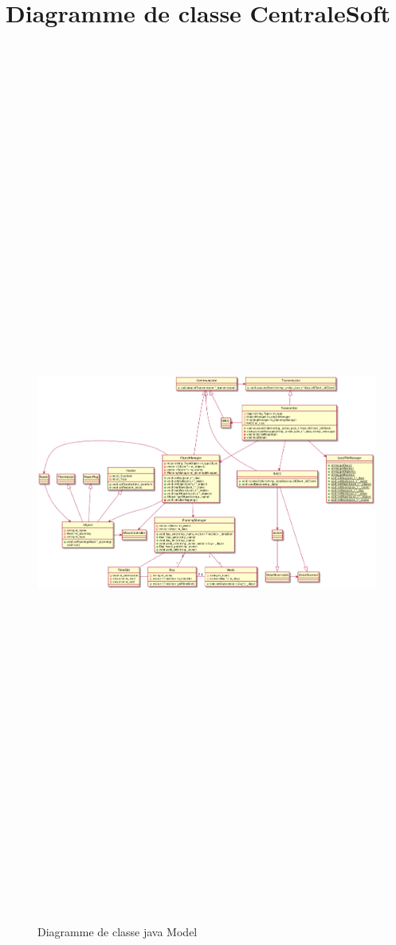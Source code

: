 \documentclass[11pt,a4paper]{report} %
\begin{document}
		\section{Diagramme de classe CentraleSoft}
		\begin{figure}[H]
			\centering
			\includegraphics[width = 18cm ,height = 30cm,keepaspectratio]{./Picture/Diagramme de class C++.png}
			\caption{Diagramme de classe java Model} 
			\label{diagClass}
		\end{figure}
		\newpage
		
\end{document}
